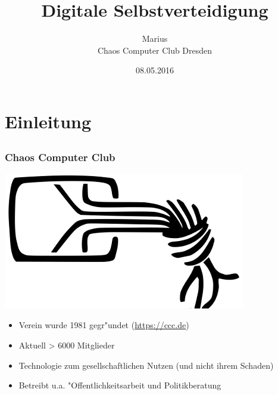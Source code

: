 \documentclass[12pt]{beamer}
\title{Digitale Selbstverteidigung}
\author{\small Marius \\\large Chaos Computer Club Dresden}
\date{08.05.2016}
\begin{document}
\maketitle

\section{Einleitung}
\subsection{}

\begin{frame}
    \frametitle{Chaos Computer Club}
    \begin{center}
	\includegraphics[height=0.2\textheight]{img/chaosknoten.png}
    \end{center}	
    \begin{itemize}
      \item<1-> Verein wurde 1981 gegr"undet (\url{https://ccc.de})
      \item<2-> Aktuell > 6000 Mitglieder
      \item<3-> Technologie zum gesellschaftlichen Nutzen (und nicht ihrem Schaden)
      \item<4-> Betreibt u.a. "Offentlichkeitsarbeit und Politikberatung
    \end{itemize}
\end{frame}
\end{document}
